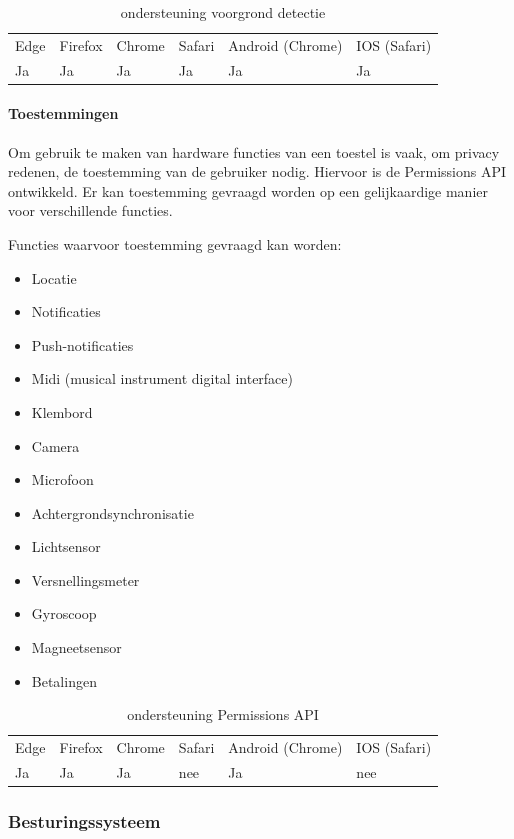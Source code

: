 \begin{table}[H]
	\centering
	\begin{tabular}{llllll}
		Edge & Firefox & Chrome & Safari & Android (Chrome) & IOS (Safari) \\
		Ja   & Ja      &  Ja     & Ja     & Ja               & Ja          
	\end{tabular}	
	\caption{ondersteuning voorgrond detectie }
\end{table}


\paragraph{Toestemmingen}

Om gebruik te maken van hardware functies van een toestel is vaak, om privacy redenen, de toestemming van de gebruiker nodig. Hiervoor is de Permissions API \autocite{Caceres2020} ontwikkeld. Er kan toestemming gevraagd worden op een gelijkaardige manier voor verschillende functies.

Functies waarvoor toestemming gevraagd kan worden:
 \begin{itemize}
	\item	Locatie
	\item	Notificaties
	\item	Push-notificaties
	\item	Midi (musical instrument digital interface)
	\item	Klembord
	\item	Camera
	\item	Microfoon
	\item	Achtergrondsynchronisatie
	\item	Lichtsensor
	\item	Versnellingsmeter
	\item	Gyroscoop
	\item	Magneetsensor
	\item	Betalingen
\end{itemize}

	\begin{table}[H]
		\centering
		\begin{tabular}{llllll}
			Edge & Firefox & Chrome & Safari & Android (Chrome) & IOS (Safari) \\
			Ja   & Ja      &  Ja     & nee     & Ja               & nee          
		\end{tabular}	
		\caption{ondersteuning Permissions API }
	\end{table}
	

\subsubsection{Besturingssysteem}
